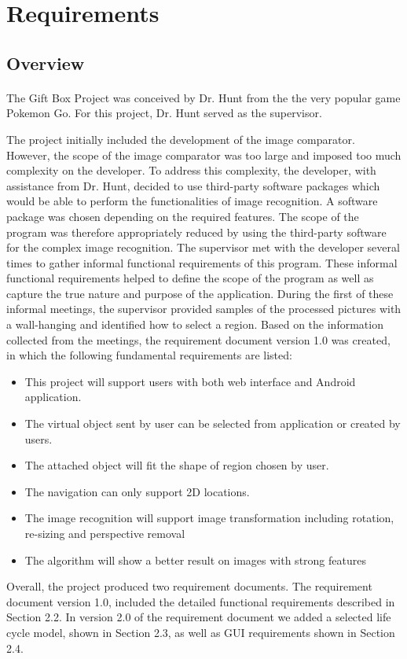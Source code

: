 \section{Requirements}
\label{sec:Requirements}
\subsection{Overview} 
\paragraph{}
The Gift Box Project was conceived by Dr. Hunt from the the very popular game Pokemon Go. For this project, Dr. Hunt served as the supervisor.
\par The project initially included the development of the image comparator. However, the scope of the image comparator was too large and imposed too much complexity on the developer. To address this complexity, the developer, with assistance from Dr. Hunt, decided to use third-party software packages which would be able to perform the functionalities of image recognition. A software package was chosen depending on the required features. The scope of the program was therefore appropriately reduced by using the third-party software for the complex image recognition. The supervisor met with the developer several times to gather informal functional requirements of this program. These informal functional requirements helped to define the scope of the program as well as capture the true nature and purpose of the application. During the first of these informal meetings, the supervisor provided samples of the processed pictures with a wall-hanging and identified how to select a region. Based on the information collected from the meetings, the requirement document version 1.0 was created, in which the following fundamental requirements are listed:
\begin{itemize}
\item This project will support users with both web interface and Android application.
\item The virtual object sent by user can be selected from application or created by users. 
\item The attached object will fit the shape of region chosen by user.
\item The navigation can only support 2D locations. 
\item The image recognition will support image transformation including rotation, re-sizing and perspective removal
\item The algorithm will show a better result on images with strong features
\end{itemize}
\par Overall, the project produced two requirement documents. The requirement document version 1.0, included the detailed functional requirements described in Section 2.2. In version 2.0 of the requirement document we added a selected life cycle model, shown in
Section 2.3, as well as GUI requirements shown in Section 2.4.


